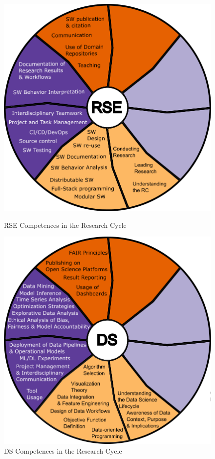 \documentclass[
        english,biblatex
    ]{lni}
\begin{document}
    \begin{figure}[h!]
    \centering
    \begin{minipage}{0.48\textwidth}
    \centering
    \includegraphics[width=\linewidth]{img/RC_RSE.png}
    \caption{RSE Competences in the Research Cycle}
    \label{fig:rc_rse}
    \end{minipage}\hfill
    \begin{minipage}{0.48\textwidth}
    \centering
    \includegraphics[width=\linewidth]{img/RC_DS.png}
    \caption{DS Competences in the Research Cycle}
    \label{fig:rc_ds}
    \end{minipage}
    \end{figure}
\end{document}
